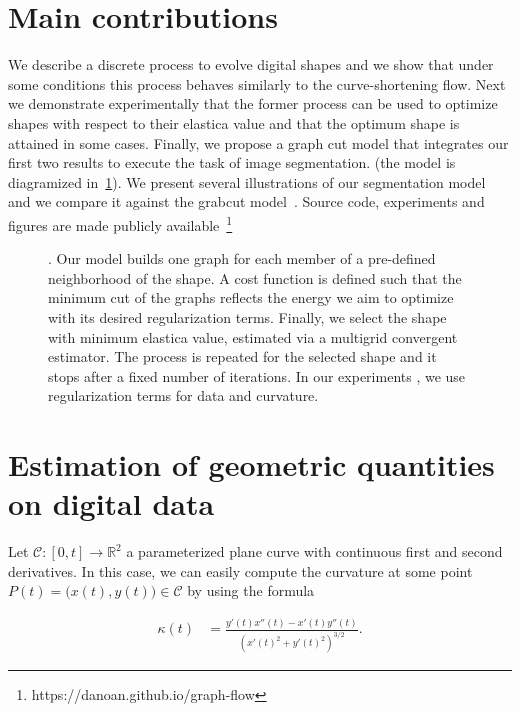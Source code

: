 \documentclass[review]{siamart220329}
\newcommand{\C}{\mathcal{C}} %
\begin{document}
\section{Main contributions}
We describe a discrete process to evolve digital shapes and we show that under
some conditions this process behaves similarly to the curve-shortening flow.
Next we demonstrate experimentally that the former process can be used to
optimize shapes with respect to their elastica value and that the optimum shape
is attained in some cases. Finally, we propose a graph cut model that integrates
our first two results to execute the task of image segmentation. (the model is
diagramized in~\cref{fig:model-overview}). We present several illustrations of
our segmentation model and we compare it against the grabcut
model~\cite{rother04grabcut}. Source code, experiments and figures are made
publicly available~\footnote{https://danoan.github.io/graph-flow}
%
%
\begin{figure}
\center

\caption{. Our  model
builds one graph for each member of a pre-defined neighborhood of the
 shape. A cost function is defined
such that the minimum cut of the graphs reflects the energy we aim to
optimize with its desired regularization terms. Finally, we select the shape
with minimum elastica value, estimated via a multigrid convergent estimator.
The process is repeated for the selected shape and it stops after a fixed
number of iterations. In our experiments , we use regularization terms for data and curvature.}
\label{fig:model-overview}
\end{figure}
%
%
%
%
%
\section{Estimation of geometric quantities on digital data}

Let $\C:[0,t] \rightarrow \mathbb{R}^2$ a parameterized plane curve with
continuous first and second derivatives. In this case, we can easily compute the
curvature at some point $P(t) = \big( x(t),y(t) \big) \in \C$ by using the
formula

\begin{align*}
  \kappa (t) &= \frac{y'(t)x''(t) -x'(t)y''(t)}{(x'(t)^2 + y'(t)^2)^{3/2}}.
\end{align*}
\end{document}
